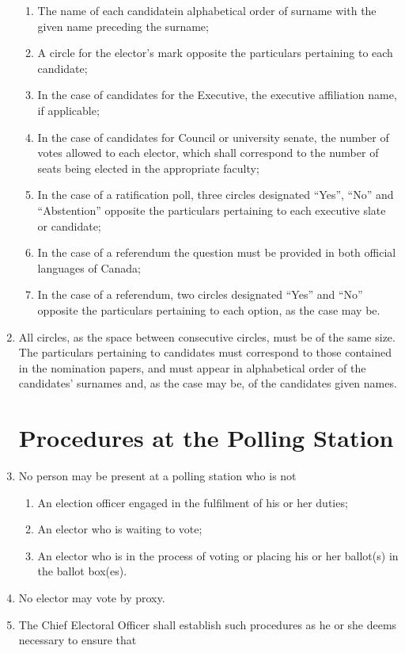 \documentclass[oneside]{book}
\begin{document}
\begin{enumerate}
\begin{enumerate}
\item The name of each candidatein alphabetical order of surname with the
given name preceding the surname; 
\item A circle for the elector's mark opposite the particulars pertaining
to each candidate; 
\item In the case of candidates for the Executive, the executive affiliation
name, if applicable; 
\item In the case of candidates for Council or university senate, the number
of votes allowed to each elector, which shall correspond to the number
of seats being elected in the appropriate faculty; 
\item In the case of a ratification poll, three circles designated ``Yes'',
``No'' and ``Abstention''
opposite the particulars pertaining to each executive slate or candidate; 
\item In the case of a referendum the question must be provided in both
official languages of Canada; 
\item In the case of a referendum, two circles designated ``Yes''
and ``No'' opposite the particulars pertaining
to each option, as the case may be. 
\end{enumerate}
\item All circles, as the space between consecutive circles, must be of
the same size. The particulars pertaining to candidates must correspond
to those contained in the nomination papers, and must appear in alphabetical
order of the candidates' surnames and, as the case may be, of the
candidates given names. 

\section{\label{Procedures_at_the_Polling_Station}Procedures at the Polling
Station }
\item No person may be present at a polling station who is not 

\begin{enumerate}
\item An election officer engaged in the fulfilment of his or her duties; 
\item An elector who is waiting to vote; 
\item An elector who is in the process of voting or placing his or her ballot(s)
in the ballot box(es). 
\end{enumerate}
\item No elector may vote by proxy. 
\item The Chief Electoral Officer shall establish such procedures as he
or she deems necessary to ensure that 


\end{enumerate}
\end{document}
